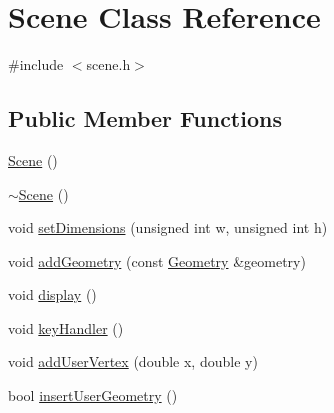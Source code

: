 \hypertarget{class_scene}{\section{Scene Class Reference}
\label{class_scene}
}


{\ttfamily \#include $<$scene.\+h$>$}

\subsection*{Public Member Functions}
\begin{DoxyCompactItemize}
\item 
\hyperlink{class_scene_ad10176d75a9cc0da56626f682d083507}{Scene} ()
\item 
\hyperlink{class_scene_a3b8cec2e32546713915f8c6303c951f1}{$\sim$\+Scene} ()
\item 
void \hyperlink{class_scene_a42b1481ada95342cfb71d6a6e6bcc3c5}{set\+Dimensions} (unsigned int w, unsigned int h)
\item 
void \hyperlink{class_scene_acbf85916173784558177e62dfba7acb9}{add\+Geometry} (const \hyperlink{class_geometry}{Geometry} \&geometry)
\item 
void \hyperlink{class_scene_ae1dc07ec420ecd407a3a47910438167a}{display} ()
\item 
void \hyperlink{class_scene_a59f325fa74a642ebeb27f59f0455e06e}{key\+Handler} ()
\item 
void \hyperlink{class_scene_a583b9304d63842f65c18fadd772045e4}{add\+User\+Vertex} (double x, double y)
\item 
bool \hyperlink{class_scene_a89f5b25d54ef4a87d1fb66eb1ad442b3}{insert\+User\+Geometry} ()
\end{DoxyCompactItemize}
